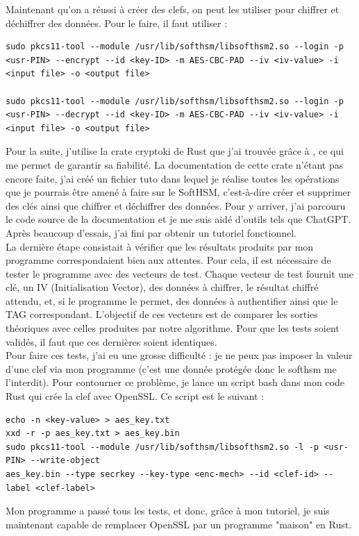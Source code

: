 \documentclass[a4paper, 12pt]{article}
\begin{document}
Maintenant qu'on a réussi à créer des clefs, on peut les utiliser pour chiffrer et déchiffrer des données. Pour le faire, il faut utiliser :
\begin{center}
\begin{minipage}{\linewidth}
\begin{lstlisting}[language = shell]
sudo pkcs11-tool --module /usr/lib/softhsm/libsofthsm2.so --login -p <usr-PIN> --encrypt --id <key-ID> -m AES-CBC-PAD --iv <iv-value> -i <input file> -o <output file>

sudo pkcs11-tool --module /usr/lib/softhsm/libsofthsm2.so --login -p <usr-PIN> --decrypt --id <key-ID> -m AES-CBC-PAD --iv <iv-value> -i <input file> -o <output file>
\end{lstlisting}
\end{minipage}
\end{center}
Pour la suite, j'utilise la crate cryptoki de Rust que j'ai trouvée grâce à \cite{bddrustcrypto}, ce qui me permet de garantir sa fiabilité.
La documentation de cette crate n'étant pas encore faite, j'ai créé un fichier tuto dans lequel je réalise toutes les opérations que je pourrais être amené à faire sur le SoftHSM, c'est-à-dire créer et supprimer des clés ainsi que chiffrer et déchiffrer des données. Pour y arriver, j'ai parcouru le code source de la documentation et je me suis aidé d'outils tels que ChatGPT. Après beaucoup d'essais, j'ai fini par obtenir un tutoriel fonctionnel.\\

La dernière étape consistait à vérifier que les résultats produits par mon programme correspondaient bien aux attentes. Pour cela, il est nécessaire de tester le programme avec des vecteurs de test. Chaque vecteur de test fournit une clé, un IV (Initialisation Vector), des données à chiffrer, le résultat chiffré attendu, et, si le programme le permet, des données à authentifier ainsi que le TAG correspondant. L'objectif de ces vecteurs est de comparer les sorties théoriques avec celles produites par notre algorithme. Pour que les tests soient validés, il faut que ces dernières soient identiques. \\

Pour faire ces tests, j'ai eu une grosse difficulté : je ne peux pas imposer la valeur d'une clef via mon programme (c'est une donnée protégée donc le softhsm me l'interdit). Pour contourner ce problème, je lance un script bash dans mon code Rust qui crée la clef avec OpenSSL. Ce script est le suivant : 
\begin{center}
\begin{minipage}{\linewidth}
\begin{lstlisting}[language = shell]
echo -n <key-value> > aes_key.txt
xxd -r -p aes_key.txt > aes_key.bin
sudo pkcs11-tool --module /usr/lib/softhsm/libsofthsm2.so -l -p <usr-PIN> --write-object
aes_key.bin --type secrkey --key-type <enc-mech> --id <clef-id> --label <clef-label>
\end{lstlisting}
\end{minipage}
\end{center}
Mon programme a passé tous les tests, et donc, grâce à mon tutoriel, je suis maintenant capable de remplacer OpenSSL par un programme "maison" en Rust.
\end{document}
